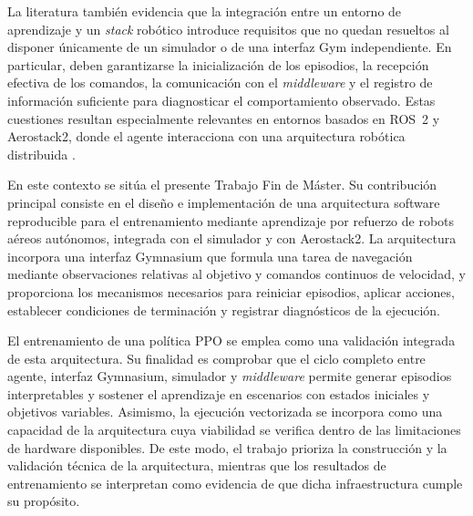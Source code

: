 La literatura también evidencia que la integración entre un entorno de
aprendizaje y un \emph{stack} robótico introduce requisitos que no quedan
resueltos al disponer únicamente de un simulador o de una interfaz Gym
independiente. En particular, deben garantizarse la inicialización de los
episodios, la recepción efectiva de los comandos, la comunicación con el
\emph{middleware} y el registro de información suficiente para diagnosticar el
comportamiento observado. Estas cuestiones resultan especialmente relevantes en
entornos basados en ROS~2 y Aerostack2, donde el agente interacciona con una
arquitectura robótica distribuida \cite{fernandez2023aerostack2,
song2021flightmare, krishnan2021airlearning, panerati2021pybullet}.

En este contexto se sitúa el presente Trabajo Fin de Máster. Su contribución
principal consiste en el diseño e implementación de una arquitectura software
reproducible para el entrenamiento mediante aprendizaje por refuerzo de robots
aéreos autónomos, integrada con el simulador y con Aerostack2. La arquitectura
incorpora una interfaz Gymnasium que formula una tarea de navegación mediante
observaciones relativas al objetivo y comandos continuos de velocidad, y
proporciona los mecanismos necesarios para reiniciar episodios, aplicar
acciones, establecer condiciones de terminación y registrar diagnósticos de la
ejecución.

El entrenamiento de una política PPO se emplea como una validación integrada de
esta arquitectura. Su finalidad es comprobar que el ciclo completo entre
agente, interfaz Gymnasium, simulador y \emph{middleware} permite generar episodios
interpretables y sostener el aprendizaje en escenarios con estados iniciales y
objetivos variables. Asimismo, la ejecución vectorizada se incorpora como una
capacidad de la arquitectura cuya viabilidad se verifica dentro de las limitaciones de
hardware disponibles. De este modo, el trabajo prioriza la construcción y la
validación técnica de la arquitectura, mientras que los resultados de entrenamiento se
interpretan como evidencia de que dicha infraestructura cumple su propósito.

